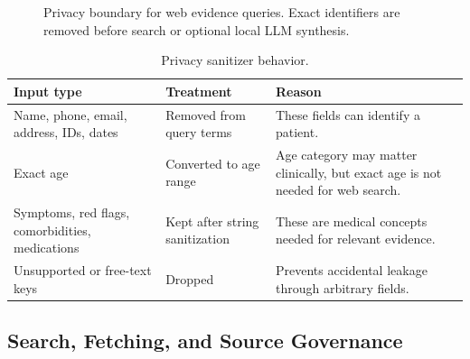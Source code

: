 \begin{figure}[htbp]
\centering
{}
\caption{Privacy boundary for web evidence queries. Exact identifiers are removed before search or optional local LLM synthesis.}
\label{fig:web_privacy_boundary}
\end{figure}

\begin{table}[htbp]
\centering
\caption{Privacy sanitizer behavior.}
\label{tab:web_privacy_sanitizer}
\begin{tabular}{p{} p{} p{}}
\toprule
\textbf{Input type} & \textbf{Treatment} & \textbf{Reason}\\
\midrule
Name, phone, email, address, IDs, dates & Removed from query terms & These fields can identify a patient.\\
Exact age & Converted to age range & Age category may matter clinically, but exact age is not needed for web search.\\
Symptoms, red flags, comorbidities, medications & Kept after string sanitization & These are medical concepts needed for relevant evidence.\\
Unsupported or free-text keys & Dropped & Prevents accidental leakage through arbitrary fields.\\
\bottomrule
\end{tabular}
\end{table}

\subsection{Search, Fetching, and Source Governance}

